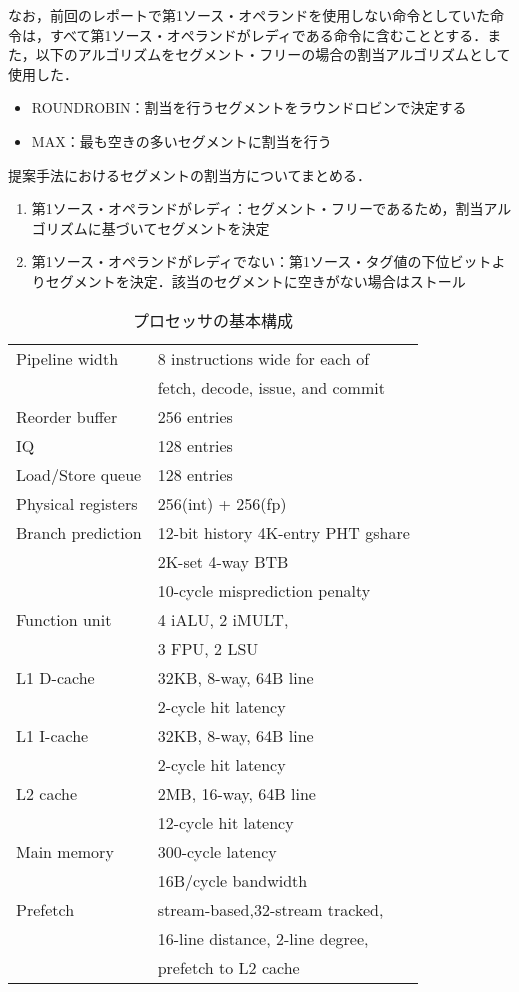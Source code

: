 \documentclass[twocolumn]{jsarticle}
\begin{document}
  なお，前回のレポートで第1ソース・オペランドを使用しない命令としていた命令は，すべて第1ソース・オペランドがレディである命令に含むこととする．また，以下のアルゴリズムをセグメント・フリーの場合の割当アルゴリズムとして使用した．

  \begin{itemize}
    \item ROUNDROBIN：割当を行うセグメントをラウンドロビンで決定する
    \item MAX：最も空きの多いセグメントに割当を行う
  \end{itemize}

  提案手法におけるセグメントの割当方についてまとめる．

  \begin{enumerate}
    \item 第1ソース・オペランドがレディ：セグメント・フリーであるため，割当アルゴリズムに基づいてセグメントを決定
    \item 第1ソース・オペランドがレディでない：第1ソース・タグ値の下位ビットよりセグメントを決定．該当のセグメントに空きがない場合はストール
  \end{enumerate}

  \begin{table}[htb]
    \caption{プロセッサの基本構成}
    \footnotesize
    \center
      \begin{tabular}{l|l} \hline \hline
       Pipeline width & 8 instructions wide for each of \\
       & fetch, decode, issue, and commit \\
       Reorder buffer & 256 entries \\
       IQ & 128 entries \\
       Load/Store queue & 128 entries \\
       Physical registers & 256(int) + 256(fp) \\
       Branch prediction & 12-bit history 4K-entry PHT gshare \\
       & 2K-set 4-way BTB \\
       & 10-cycle misprediction penalty \\
       Function unit & 4 iALU, 2 iMULT, \\
       &  3 FPU, 2 LSU \\
       L1 D-cache & 32KB, 8-way, 64B line \\
        & 2-cycle hit latency \\
       L1 I-cache & 32KB, 8-way, 64B line \\
        &  2-cycle hit latency \\
       L2 cache & 2MB, 16-way, 64B line \\
        & 12-cycle hit latency \\  
       Main memory & 300-cycle latency \\
       & 16B/cycle bandwidth \\ 
       Prefetch & stream-based,32-stream tracked,  \\ 
       & 16-line distance, 2-line degree, \\
       & prefetch to L2 cache \\ \hline
    \end{tabular}
    \label{tab:base_config}
  \end{table}
\end{document}
